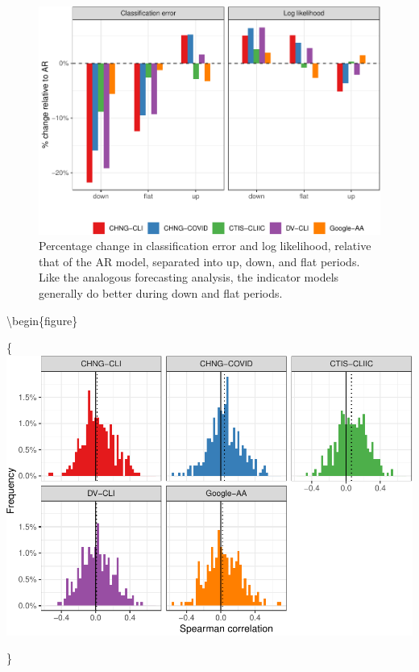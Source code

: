 \documentclass[9pt,twoside,lineno]{pnas-new}
\begin{document}
\clearpage

\begin{figure}

{\centering \includegraphics[width=\textwidth]{fig/hotspots-upswing-downswing-1} 

}

\caption{Percentage change in classification error and log likelihood, relative that of the AR model, separated into up, down, and flat periods. Like the analogous forecasting analysis, the indicator models generally do better during down and flat periods.}\label{fig:hotspots-upswing-downswing}
\end{figure}

\textbackslash begin\{figure\}

\{\centering \includegraphics[width=\textwidth]{fig/cor-wis-ratio-1}

\}
\end{document}
